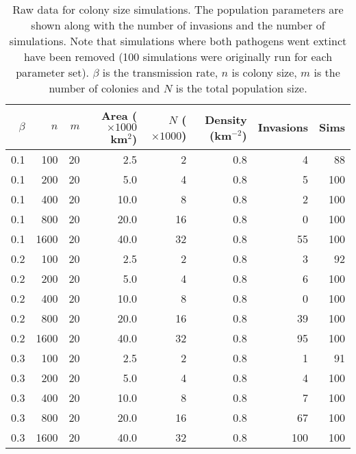 \begin{table}[ht]
\centering
\caption[
Raw data for colony size simulations
  ]{
Raw data for colony size simulations. 
The population parameters are shown along with the number of invasions and the number of simulations.
Note that simulations where both pathogens went extinct have been removed (100 simulations were originally run for each parameter set).
$\beta$ is the transmission rate, $n$ is colony size, $m$ is the number of colonies and $N$ is the total population size.
} 
\label{C-dens1}
\begingroup\small
\begin{tabular}{@{}rrrrrrrr@{}}
  \toprule
$\beta$ & $n$ & $m$ & Area \tiny{($\times 1000$ km$^2$)} & $N$ \tiny{($\times 1000$)} & Density \tiny{(km$^{-2}$)} & Invasions & Sims \\ 
  \midrule
0.1 & 100 & 20 & 2.5 & 2 & 0.8 & 4 & 88 \\ 
  0.1 & 200 & 20 & 5.0 & 4 & 0.8 & 5 & 100 \\ 
  0.1 & 400 & 20 & 10.0 & 8 & 0.8 & 2 & 100 \\ 
  0.1 & 800 & 20 & 20.0 & 16 & 0.8 & 0 & 100 \\ 
  0.1 & 1600 & 20 & 40.0 & 32 & 0.8 & 55 & 100 \\ 
  0.2 & 100 & 20 & 2.5 & 2 & 0.8 & 3 & 92 \\ 
  0.2 & 200 & 20 & 5.0 & 4 & 0.8 & 6 & 100 \\ 
  0.2 & 400 & 20 & 10.0 & 8 & 0.8 & 0 & 100 \\ 
  0.2 & 800 & 20 & 20.0 & 16 & 0.8 & 39 & 100 \\ 
  0.2 & 1600 & 20 & 40.0 & 32 & 0.8 & 95 & 100 \\ 
  0.3 & 100 & 20 & 2.5 & 2 & 0.8 & 1 & 91 \\ 
  0.3 & 200 & 20 & 5.0 & 4 & 0.8 & 4 & 100 \\ 
  0.3 & 400 & 20 & 10.0 & 8 & 0.8 & 7 & 100 \\ 
  0.3 & 800 & 20 & 20.0 & 16 & 0.8 & 67 & 100 \\ 
  0.3 & 1600 & 20 & 40.0 & 32 & 0.8 & 100 & 100 \\ 
   \bottomrule
\end{tabular}
\endgroup
\end{table}





